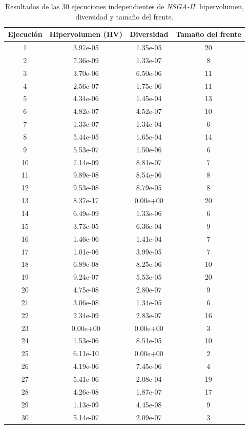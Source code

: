 \begin{table}[H]
\centering
\footnotesize
\begin{tabular}{c|c|c|c}
\textbf{Ejecución} & \textbf{Hipervolumen (HV)} & \textbf{Diversidad} & \textbf{Tamaño del frente} \\
\hline
1  & 3.97e-05 & 1.35e-05 & 20 \\
2  & 7.36e-09 & 1.33e-07 & 8 \\
3  & 3.70e-06 & 6.50e-06 & 11 \\
4  & 2.56e-07 & 1.75e-06 & 11 \\
5  & 4.34e-06 & 1.45e-04 & 13 \\
6  & 4.82e-07 & 4.52e-07 & 10 \\
7  & 1.33e-07 & 1.34e-04 & 6 \\
8  & 5.44e-05 & 1.65e-04 & 14 \\
9  & 5.53e-07 & 1.50e-06 & 6 \\
10 & 7.14e-09 & 8.81e-07 & 7 \\
11 & 9.89e-08 & 8.54e-06 & 8 \\
12 & 9.53e-08 & 8.79e-05 & 8 \\
13 & 8.37e-17 & 0.00e+00 & 20 \\
14 & 6.49e-09 & 1.33e-06 & 6 \\
15 & 3.73e-05 & 6.36e-04 & 9 \\
16 & 1.46e-06 & 1.41e-04 & 7 \\
17 & 1.01e-06 & 3.99e-05 & 7 \\
18 & 6.89e-08 & 8.25e-06 & 10 \\
19 & 9.24e-07 & 5.53e-05 & 20 \\
20 & 4.75e-08 & 2.80e-07 & 9 \\
21 & 3.06e-08 & 1.34e-05 & 6 \\
22 & 2.34e-09 & 2.83e-07 & 16 \\
23 & 0.00e+00 & 0.00e+00 & 3 \\
24 & 1.53e-06 & 8.51e-05 & 10 \\
25 & 6.11e-10 & 0.00e+00 & 2 \\
26 & 4.19e-06 & 7.45e-06 & 4 \\
27 & 5.41e-06 & 2.08e-04 & 19 \\
28 & 4.26e-08 & 1.87e-07 & 17 \\
29 & 1.13e-09 & 4.45e-08 & 9 \\
30 & 5.14e-07 & 2.09e-07 & 3 \\
\hline
\end{tabular}
\caption{Resultados de las 30 ejecuciones independientes de \textit{NSGA-II}: hipervolumen, diversidad y tamaño del frente.}
\label{tab:frentes}
\end{table}

